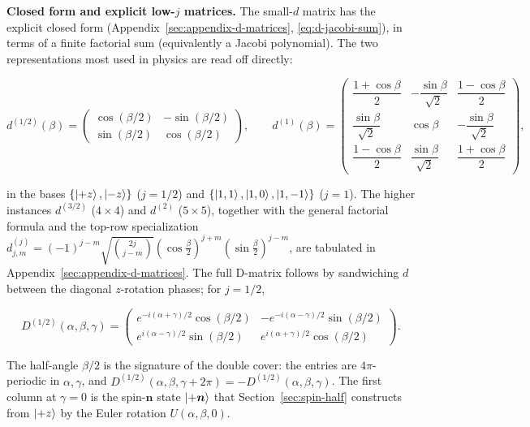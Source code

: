 \medskip\noindent\textbf{Closed form and explicit low-$j$ matrices.} The small-$d$ matrix has the explicit closed form (Appendix~\ref{sec:appendix-d-matrices}, \eqref{eq:d-jacobi-sum}), in terms of a finite factorial sum (equivalently a Jacobi polynomial). The two representations most used in physics are read off directly:
\begin{linenomath}
    \begin{equation}
        d^{(1/2)}(\beta)=\begin{pmatrix}\cos(\beta/2)&-\sin(\beta/2)\\[2pt]\sin(\beta/2)&\cos(\beta/2)\end{pmatrix},\qquad
        d^{(1)}(\beta)=\begin{pmatrix}
        \dfrac{1{+}\cos\beta}{2}&-\dfrac{\sin\beta}{\sqrt2}&\dfrac{1{-}\cos\beta}{2}\\[6pt]
        \dfrac{\sin\beta}{\sqrt2}&\cos\beta&-\dfrac{\sin\beta}{\sqrt2}\\[6pt]
        \dfrac{1{-}\cos\beta}{2}&\dfrac{\sin\beta}{\sqrt2}&\dfrac{1{+}\cos\beta}{2}
        \end{pmatrix},
        \label{eq:d1-vector}
    \end{equation}
\end{linenomath}
in the bases $\{\ket{+z},\ket{-z}\}$ ($j=1/2$) and $\{\ket{1,1},\ket{1,0},\ket{1,-1}\}$ ($j=1$). The higher instances $d^{(3/2)}$ ($4\times4$) and $d^{(2)}$ ($5\times5$), together with the general factorial formula and the top-row specialization $d^{(j)}_{j,m}=(-1)^{j-m}\sqrt{\binom{2j}{j-m}}(\cos\frac\beta2)^{j+m}(\sin\frac\beta2)^{j-m}$, are tabulated in Appendix~\ref{sec:appendix-d-matrices}. The full D-matrix follows by sandwiching $d$ between the diagonal $z$-rotation phases; for $j=1/2$,
\begin{linenomath}
    \begin{equation*}
        D^{(1/2)}(\alpha,\beta,\gamma)=\begin{pmatrix}
        e^{-i(\alpha+\gamma)/2}\cos(\beta/2)&-e^{-i(\alpha-\gamma)/2}\sin(\beta/2)\\[2pt]
        e^{i(\alpha-\gamma)/2}\sin(\beta/2)&e^{i(\alpha+\gamma)/2}\cos(\beta/2)
        \end{pmatrix}.
    \end{equation*}
\end{linenomath}
The half-angle $\beta/2$ is the signature of the double cover: the entries are $4\pi$-periodic in $\alpha,\gamma$, and $D^{(1/2)}(\alpha,\beta,\gamma+2\pi)=-D^{(1/2)}(\alpha,\beta,\gamma)$. The first column at $\gamma=0$ is the spin-$\bm n$ state $\ket{+\bm n}$ that Section~\ref{sec:spin-half} constructs from $\ket{+z}$ by the Euler rotation $U(\alpha,\beta,0)$.

